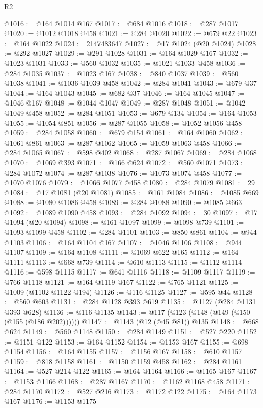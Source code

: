 \begin{lexlean}{R2}
\begin{coremodule}
@1016 := @164 @1014 @167
@1017 := @684 @1016
@1018 := @287 @1017
@1020 := @1012 @1018 @458
@1021 := @284 @1020
@1022 := @679 @22
@1023 := @164 @1022
@1024 := 2147483647
@1027 := @17 @1024 (@20 @1024)
@1028 := @292 @1027
@1029 := @291 @1028
@1031 := @164 @1029 @167
@1032 := @1023 @1031
@1033 := @560 @1032
@1035 := @1021 @1033 @458
@1036 := @284 @1035
@1037 := @1023 @167
@1038 := @840 @1037
@1039 := @560 @1038
@1041 := @1036 @1039 @458
@1042 := @284 @1041
@1043 := @679 @37
@1044 := @164 @1043
@1045 := @682 @37
@1046 := @164 @1045
@1047 := @1046 @167
@1048 := @1044 @1047
@1049 := @287 @1048
@1051 := @1042 @1049 @458
@1052 := @284 @1051
@1053 := @679 @134
@1054 := @164 @1053
@1055 := @1054 @851
@1056 := @287 @1055
@1058 := @1052 @1056 @458
@1059 := @284 @1058
@1060 := @679 @154
@1061 := @164 @1060
@1062 := @1061 @861
@1063 := @287 @1062
@1065 := @1059 @1063 @458
@1066 := @284 @1065
@1067 := @598 @402
@1068 := @287 @1067
@1069 := @284 @1068
@1070 := @1069 @393
@1071 := @166 @624
@1072 := @560 @1071
@1073 := @284 @1072
@1074 := @287 @1038
@1076 := @1073 @1074 @458
@1077 := @1070 @1076
@1079 := @1066 @1077 @458
@1080 := @284 @1079
@1081 := 29
@1084 := @17 @1081 (@20 @1081)
@1085 := @161 @1084
@1086 := @1085 @669
@1088 := @1080 @1086 @458
@1089 := @284 @1088
@1090 := @1085 @663
@1092 := @1089 @1090 @458
@1093 := @284 @1092
@1094 := 30
@1097 := @17 @1094 (@20 @1094)
@1098 := @161 @1097
@1099 := @1098 @739
@1101 := @1093 @1099 @458
@1102 := @284 @1101
@1103 := @850 @861
@1104 := @944 @1103
@1106 := @164 @1104 @167
@1107 := @1046 @1106
@1108 := @944 @1107
@1109 := @164 @1108
@1111 := @1069 @622 @165
@1112 := @164 @1111
@1113 := @668 @739
@1114 := @610 @1113
@1115 := @1112 @1114
@1116 := @598 @1115
@1117 := @641 @1116
@1118 := @1109 @1117
@1119 := @766 @1118
@1121 := @164 @1119 @167
@1122 := @765 @1121
@1125 := @1009 (@1102 @1122 @194)
@1126 := @116 @1125
@1127 := @595 @44
@1128 := @560 @603
@1131 := @284 @1128 @393 @619
@1135 := @1127 (@284 @1131 @393 @628)
@1136 := @116 @1135
@1143 := @117 (@123 (@148 (@149 (@150 (@155 (@186 @202))))))
@1147 := @1143 (@12 (@45 @81)) @135
@1148 := @668 @624
@1149 := @560 @1148
@1150 := @284 @1149
@1151 := @527 @220
@1152 := @1151 @122
@1153 := @164 @1152
@1154 := @1153 @167
@1155 := @698 @1154
@1156 := @164 @1155
@1157 := @1156 @167
@1158 := @610 @1157
@1159 := @818 @1158
@1161 := @1150 @1159 @458
@1162 := @284 @1161
@1164 := @527 @214 @122
@1165 := @164 @1164
@1166 := @1165 @167
@1167 := @1153 @1166
@1168 := @287 @1167
@1170 := @1162 @1168 @458
@1171 := @284 @1170
@1172 := @527 @216
@1173 := @1172 @122
@1175 := @164 @1173 @167
@1176 := @1153 @1175

\end{coremodule}
\end{lexlean}
